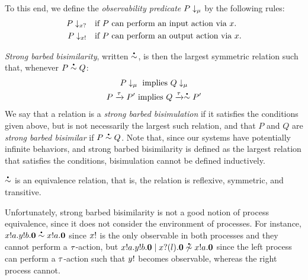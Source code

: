 To this end, we define the \emph{observability predicate} \( P\downarrow_{\mu} \) by the following rules:
\begin{align}
  P\downarrow_{x?}  &\quad \textrm{if \( P \) can perform an input action via \( x \).} \\
  P\downarrow_{x!} &\quad \textrm{if \( P \) can perform an output action via \( x \).}
\end{align}

\emph{Strong barbed bisimilarity}, written \( \sbbisim{}{} \), is then the largest symmetric relation such that, whenever \( \sbbisim{P}{Q} \):
\begin{gather}
  \observable{P}{\mu}~\textrm{implies}~\observable{Q}{\mu} \\
  \transition{P}{\Atau}{P'}~\textrm{implies}~\transition{Q}{\Atau}{\sbbisim{}{} P'}
\end{gather}
We say that a relation is a \emph{strong barbed bisimulation} if it satisfies the conditions given above, but is not necessarily the largest such relation, and that \( P \) and \( Q \) are \emph{strong barbed bisimilar} if \( \sbbisim{P}{Q} \).
Note that, since our systems have potentially infinite behaviors, and strong barbed bisimilarity is defined as the largest relation that satisfies the conditions, bisimulation cannot be defined inductively.

\begin{theorem}
  \( \sbbisim{}{} \) is an equivalence relation, that is, the relation is reflexive, symmetric, and transitive.
\end{theorem}

Unfortunately, strong barbed bisimilarity is not a good notion of process equivalence, since it does not consider the environment of processes.
For instance, \( \sbbisim{\Pout{x}{a}{\Pout{y}{b}{\Pend}}}{\Pout{x}{a}{\Pend}} \) since \( x! \) is the only observable in both processes and they cannot perform a \( \tau \)-action, but \( \nsbbisim{\Ppar{\Pout{x}{a}{\Pout{y}{b}{\Pend}}}{\Pin{x}{l}{\Pend}}}{\Pout{x}{a}{\Pend}} \) since the left process can perform a \( \tau \)-action such that \( y! \) becomes observable, whereas the right process cannot.


